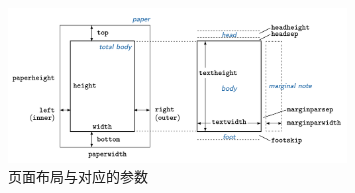 \begin{figure}[H] 
	\centering
	\includegraphics[width=0.8\textwidth]{image/chap02/composition_general.png}
	\caption{页面布局与对应的参数}
	\label{fig:composition_general}
\end{figure}